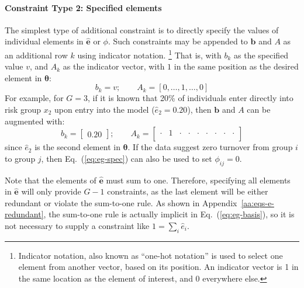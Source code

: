 \paragraph{Constraint Type 2: Specified elements}
\label{con:spec-element}
The simplest type of additional constraint is to
directly specify the values of individual elements in $\bm{\hat{e}}$ or $\phi$.
Such constraints may be appended to $\bm{b}$ and $A$
as an additional row $k$ using indicator notation.%
\footnote{Indicator notation, also known as ``one-hot notation'' is used to
  select one element from another vector, based on its position.
  An indicator vector is 1 in the same location as the element of interest,
  and 0 everywhere else.}
That is, with $b_k$ as the specified value $v$,
and $A_k$ as the indicator vector,
with $1$ in the same position as the desired element in $\bm{\theta}$:
\begin{equation}\label{eq:spec-elem}
  b_k = v;\qquad
  A_k = [0,\dots,1,\dots,0]
\end{equation}
For example, for $G = 3$, if it is known that 20\% of individuals
enter directly into risk group $x_2$ upon entry into the model ($\hat{e}_2 = 0.20$),
then $\bm{b}$ and $A$ can be augmented with:
\begin{equation}\label{eq:eg-spec}
b_k = \left[\begin{array}{c} 0.20 \end{array}\right];\qquad
A_k = \left[\begin{array}{ccccccccc}
\cdot & 1 & \cdot & \cdot & \cdot & \cdot & \cdot & \cdot & \cdot \\
\end{array}\right] 
\end{equation}
since $\hat{e}_2$ is the second element in $\bm{\theta}$.
If the data suggest zero turnover from group $i$ to group $j$,
then Eq.~(\ref{eq:eg-spec}) can also be used to set $\phi_{ij} = 0$.
\par
Note that the elements of $\bm{\hat{e}}$ must sum to one.
Therefore, specifying all elements in $\bm{\hat{e}}$
will only provide $G-1$ constraints,
as the last element will be either redundant or violate the sum-to-one rule.
As shown in Appendix~\ref{aa:eqs-e-redundant},
the sum-to-one rule is actually implicit in Eq.~(\ref{eq:eg-basis}),
so it is not necessary to supply a constraint like $1 = \sum_{i} \hat{e}_i$.
